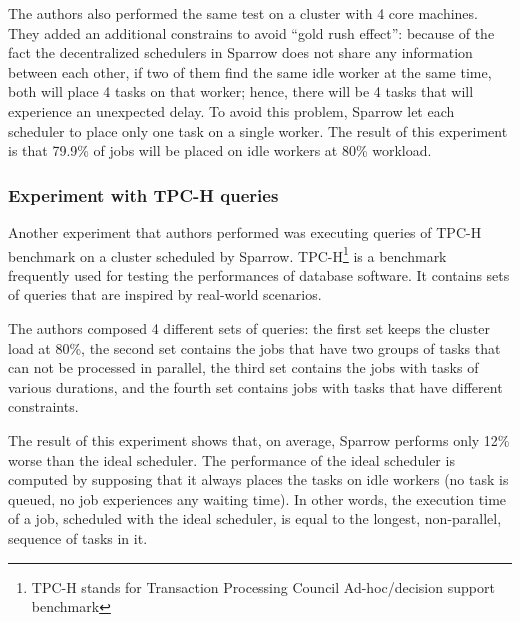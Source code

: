 \documentclass[11pt]{article}
\begin{document}
            The authors also performed the same test on a cluster with 4 core machines. They added an additional constrains to avoid ``gold rush effect'': because of the fact the decentralized schedulers in Sparrow does not share any information between each other, if two of them find the same idle worker at the same time, both will place 4 tasks on that worker; hence, there will be 4 tasks that will experience an unexpected delay. To avoid this problem, Sparrow let each scheduler to place only one task on a single worker. The result of this experiment is that 79.9\% of jobs will be placed on idle workers at 80\% workload.
            
            
        \subsubsection*{Experiment with TPC-H queries}
        
        	Another experiment that authors performed was executing queries of TPC-H benchmark on a cluster scheduled by Sparrow. TPC-H\footnote{TPC-H stands for Transaction Processing Council Ad-hoc/decision support benchmark} is a benchmark frequently used for testing the performances of database software. It contains sets of queries that are inspired by real-world scenarios.
            
            The authors composed 4 different sets of queries: the first set keeps the cluster load at 80\%, the second set contains the jobs that have two groups of tasks that can not be processed in parallel, the third set contains the jobs with tasks of various durations, and the fourth set contains jobs with tasks that have different constraints.
            
            The result of this experiment shows that, on average, Sparrow performs only 12\% worse than the ideal scheduler. The performance of the ideal scheduler is computed by supposing that it always places the tasks on idle workers (no task is queued, no job experiences any waiting time). In other words, the execution time of a job, scheduled with the ideal scheduler, is equal to the longest, non-parallel, sequence of tasks in it.
            
\end{document}
